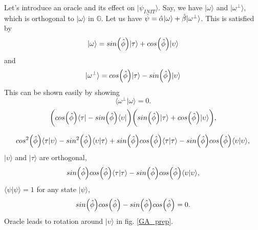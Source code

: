Let's introduce an oracle and its effect on $|\psi_{INIT}\rangle$. Say, we have $|\omega\rangle$ and $|\omega^{\perp}\rangle$, which is orthogonal to $|\omega\rangle$ in $\mathbb{G}$. Let us have $\Hat{\psi}=\Hat{\alpha}|\omega\rangle + \Hat{\beta}|\omega^{\perp}\rangle$. This is satisfied by
\begin{equation}
    |\omega\rangle = sin\Bigl(\Hat{\phi}\Bigr)|\tau \rangle  + cos\Bigl(\Hat{\phi}\Bigr)|\upsilon\rangle
\end{equation}
and
\begin{equation}
    |\omega^{\perp}\rangle = cos\Bigl(\Hat{\phi}\Bigr)|\tau \rangle  -sin\Bigl(\Hat{\phi}\Bigr)|\upsilon\rangle
\end{equation}
This can be shown easily by showing
\begin{equation}
    \langle \omega^{\perp}|\omega\rangle = 0.
\end{equation}
\begin{equation}
     \biggl(cos\Bigl(\Hat{\phi}\Bigr)\langle\tau |  -sin\Bigl(\Hat{\phi}\Bigr)\langle \upsilon|\biggl)\biggl(sin\Bigl(\Hat{\phi}\Bigr)|\tau \rangle  + cos\Bigl(\Hat{\phi}\Bigr)|\upsilon\rangle\biggl),
\end{equation}

\begin{equation}
     cos^2\Bigl(\Hat{\phi}\Bigr)\langle\tau | \upsilon \rangle -sin^2\Bigl(\Hat{\phi}\Bigr)\langle \upsilon|\tau \rangle + sin\Bigl(\Hat{\phi}\Bigr)cos\Bigl(\Hat{\phi}\Bigr)\langle\tau|\tau \rangle  - sin\Bigl(\Hat{\phi}\Bigr)cos\Bigl(\Hat{\phi}\Bigr)\langle\upsilon|\upsilon\rangle,
\end{equation}
$|\upsilon\rangle$ and $|\tau\rangle$ are orthogonal,
\begin{equation}
sin\Bigl(\Hat{\phi}\Bigr)cos\Bigl(\Hat{\phi}\Bigr)\langle\tau|\tau \rangle  - sin\Bigl(\Hat{\phi}\Bigr)cos\Bigl(\Hat{\phi}\Bigr)\langle\upsilon|\upsilon\rangle,
\end{equation}
$\langle\psi|\psi\rangle=1$ for any state $|\psi\rangle$,
\begin{equation}
    sin\Bigl(\Hat{\phi}\Bigr)cos\Bigl(\Hat{\phi}\Bigr)  - sin\Bigl(\Hat{\phi}\Bigr)cos\Bigl(\Hat{\phi}\Bigr) =0.
\end{equation}
Oracle leads to rotation around $|\upsilon\rangle$ in fig. \ref{GA_prep}.


